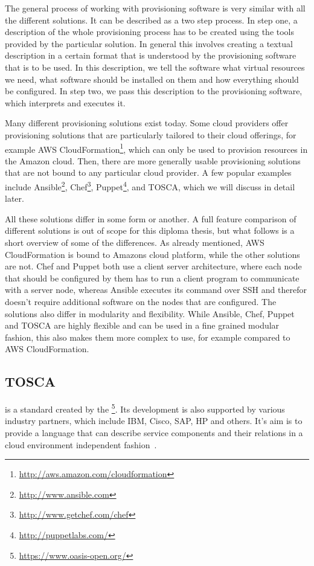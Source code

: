 The general process of working with provisioning software is very similar with all the different solutions.
It can be described as a two step process.
In step one, a description of the whole provisioning process has to be created using the tools provided by the particular solution.
In general this involves creating a textual description in a certain format that is understood by the provisioning software that is to be used.
In this description, we tell the software what virtual resources we need, what software should be installed on them and how everything should be configured.
In step two, we pass this description to the provisioning software, which interprets and executes it.

Many different provisioning solutions exist today.
Some cloud providers offer provisioning solutions that are particularly tailored to their cloud offerings, for example AWS CloudFormation\footnote{\url{http://aws.amazon.com/cloudformation}}, which can only be used to provision resources in the Amazon cloud.
Then, there are more generally usable provisioning solutions that are not bound to any particular cloud provider.
A few popular examples include Ansible\footnote{\url{http://www.ansible.com}}, Chef\footnote{\url{http://www.getchef.com/chef}}, Puppet\footnote{\url{http://puppetlabs.com/}}, and TOSCA, which we will discuss in detail later.

All these solutions differ in some form or another.
A full feature comparison of different solutions is out of scope for this diploma thesis, but what follows is a short overview of some of the differences.
As already mentioned, AWS CloudFormation is bound to Amazons cloud platform, while the other solutions are not.
Chef and Puppet both use a client server architecture, where each node that should be configured by them has to run a client program to communicate with a server node, whereas Ansible executes its command over SSH and therefor doesn't require additional software on the nodes that are configured.
The solutions also differ in modularity and flexibility. While Ansible, Chef, Puppet and TOSCA are highly flexible and can be used in a fine grained modular fashion, this also makes them more complex to use, for example compared to AWS CloudFormation.

\subsection{TOSCA}

 is a standard created by the \footnote{\url{https://www.oasis-open.org/}}.
Its development is also supported by various industry partners, which include IBM, Cisco, SAP, HP and others.
It's aim is to provide a language that can describe service components and their relations in a cloud environment independent fashion~\autocite{tosca:spec}.

